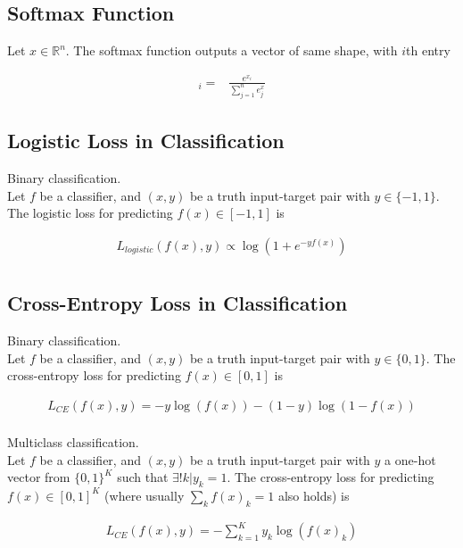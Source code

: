 \documentclass{article}
\begin{document}
\subsection{Softmax Function}

Let $ x \in \mathbb{R}^n$. The softmax function outputs a vector of same shape, with $i$th entry

\begin{eqnarray*}
	[f(x)]_i =& \frac{e^{x_i}}{\sum_{j=1}^ne^x_j}
\end{eqnarray*}


\subsection{Logistic Loss in Classification}

Binary classification.\\
Let $f$ be a classifier, and $(x,y)$ be a truth input-target pair with $y \in \{-1,1\}$. The logistic loss for predicting $f(x) \in [-1,1]$ is

\begin{eqnarray*}
	L_{logistic}(f(x),y) \propto  \log(1+e^{-yf(x)}) \\
\end{eqnarray*}


\subsection{Cross-Entropy Loss in Classification}

Binary classification.\\
Let $f$ be a classifier, and $(x,y)$ be a truth input-target pair with $y \in \{0,1\}$. The cross-entropy loss for predicting $f(x) \in [0,1]$ is

\begin{eqnarray*}
	L_{CE}(f(x),y) = -y \log(f(x)) - (1-y) \log (1-f(x)) \\
\end{eqnarray*}


Multiclass classification.\\
Let $f$ be a classifier, and $(x,y)$ be a truth input-target pair with $y$ a one-hot vector from $\{0,1\}^K$ such that $\exists ! k | y_k =1$. The cross-entropy loss for predicting $f(x) \in [0,1]^K$ (where usually $\sum_k f(x)_k = 1$ also holds) is

\begin{eqnarray*}
	L_{CE}(f(x),y) = - \sum_{k=1}^K y_k \log(f(x)_k) \\
\end{eqnarray*}
\end{document}
